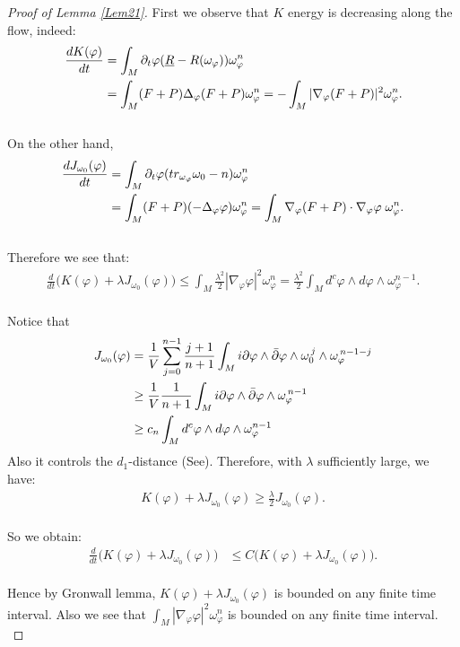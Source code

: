 \documentclass[11pt]{amsart}
\numberwithin{equation}{section}
\begin{document}
\begin{proof}[Proof of Lemma \ref{Lem21}]
	First we observe that $K$ energy is decreasing along the flow,  indeed:
\begin{align}
	\frac{dK(\varphi)}{dt} &=\int_M\partial_t\varphi(\underline{R}-R(\omega_{\varphi}))\omega_{\varphi}^n \notag\\
	& =\int_M(F+P)\Delta_{\varphi}(F+P)\omega_{\varphi}^n =-\int_M|\nabla_{\varphi}(F+P)|^2\omega_{\varphi}^n.
\end{align}\\
On the other hand,
\begin{align}
	\frac{dJ_{\omega_0}(\varphi)}{dt} &=\int_M\partial_t\varphi(tr_{\omega_{\varphi}}\omega_0-n)\omega_{\varphi}^n \notag\\
	& =\int_M(F+P)(-\Delta_{\varphi}\varphi)\omega_{\varphi}^n =\int_M\nabla_{\varphi}(F+P)\cdot \nabla_{\varphi}\varphi\;\omega_{\varphi}^n.
\end{align}\\
Therefore we see that:
\begin{align}
	\frac{d}{dt}\big(K(\varphi)+\lambda J_{\omega_0}(\varphi)\big) \le  \int_M\frac{\lambda^2}{2}|\nabla_{\varphi}\varphi|^2\omega_{\varphi}^n =\frac{\lambda^2}{2}\int_Md^c\varphi\wedge d\varphi\wedge \omega_{\varphi}^{n-1}.
\end{align}\\
Notice that 
\begin{align}
	J_{\omega_0}(\varphi) &= \frac{1}{V}\sum_{j=0}^{n-1} \frac{j+1}{n+1} \int_M i\partial\varphi\wedge\bar\partial\varphi \wedge \omega_0^{\,j} \wedge \omega_\varphi^{\,n-1-j} \notag\\
	&\ge  \frac{1}{V} \frac{1}{n+1} \int_M i\partial\varphi\wedge\bar\partial\varphi \wedge \omega_\varphi^{\,n-1} \notag\\
	& \ge  c_n\int_Md^c\varphi\wedge d\varphi\wedge \omega_{\varphi}^{n-1}
\end{align}
Also it controls the $d_1$-distance (See\cite{Darvas1402}). Therefore, with $\lambda$ sufficiently large, we have:
\begin{align}
	K(\varphi)+\lambda J_{\omega_0}(\varphi)\ge  \frac{\lambda}{2}J_{\omega_0}(\varphi).
\end{align}\\
So we obtain:
\begin{align}
	\frac{d}{dt}\big(K(\varphi)+\lambda J_{\omega_0}(\varphi)\big)	&\le  C\big(K(\varphi)+\lambda J_{\omega_0}(\varphi)\big).
\end{align}\\
Hence by Gronwall lemma,  $K(\varphi)+\lambda J_{\omega_0}(\varphi)$ is bounded on any finite time interval.  Also we see that $\int_M|\nabla_{\varphi}\varphi|^2\omega_{\varphi}^n$ is bounded on any finite time interval. \\
\end{proof}
\end{document}
